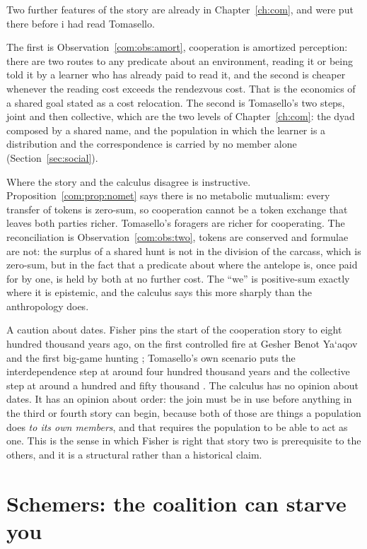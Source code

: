 Two further features of the story are already in Chapter~\ref{ch:com}, and were put there before i had read Tomasello.

The first is Observation~\ref{com:obs:amort}, cooperation is amortized perception: there are two routes to any predicate about an environment, reading it or being told it by a learner who has already paid to read it, and the second is cheaper whenever the reading cost exceeds the rendezvous cost. That is the economics of a shared goal stated as a cost relocation. The second is Tomasello's two steps, joint and then collective, which are the two levels of Chapter~\ref{ch:com}: the dyad composed by a shared name, and the population in which the learner is a distribution and the correspondence is carried by no member alone (Section~\ref{sec:social}).

Where the story and the calculus disagree is instructive. Proposition~\ref{com:prop:nomet} says there is no metabolic mutualism: every transfer of tokens is zero-sum, so cooperation cannot be a token exchange that leaves both parties richer. Tomasello's foragers are richer for cooperating. The reconciliation is Observation~\ref{com:obs:two}, tokens are conserved and formulae are not: the surplus of a shared hunt is not in the division of the carcass, which is zero-sum, but in the fact that a predicate about where the antelope is, once paid for by one, is held by both at no further cost. The ``we'' is positive-sum exactly where it is epistemic, and the calculus says this more sharply than the anthropology does.

A caution about dates. Fisher pins the start of the cooperation story to eight hundred thousand years ago, on the first controlled fire at Gesher Benot Ya\textquoteleft aqov and the first big-game hunting \cite{goreninbar2004,thieme1997}; Tomasello's own scenario puts the interdependence step at around four hundred thousand years and the collective step at around a hundred and fifty thousand \cite{tomasello2012}. The calculus has no opinion about dates. It has an opinion about order: the join must be in use before anything in the third or fourth story can begin, because both of those are things a population does \emph{to its own members}, and that requires the population to be able to act as one. This is the sense in which Fisher is right that story two is prerequisite to the others, and it is a structural rather than a historical claim.

\section{Schemers: the coalition can starve you}
\label{st:sec:schemers}

